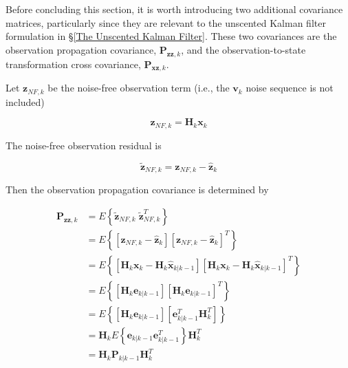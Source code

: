Before concluding this section, it is worth introducing two additional covariance matrices,
particularly since they are relevant to the unscented Kalman filter formulation in
\S\ref{The Unscented Kalman Filter}.
These two covariances are the observation propagation covariance, $\mathbf{P}_{\mathbf{zz},k}$,
and the observation-to-state transformation cross covariance, $\mathbf{P}_{\mathbf{xz},k}$.

Let $\mathbf{z}_{NF,k}$ be the noise-free observation term (i.e., the $\mathbf{v}_k$ noise
sequence is not included)

\begin{equation*}
    \mathbf{z}_{NF,k} = \mathbf{H}_k \mathbf{x}_k
\end{equation*}

The noise-free observation residual is

\begin{equation*}
    \tilde{\mathbf{z}}_{NF,k} = \mathbf{z}_{NF,k} - \hat{\mathbf{z}}_k
\end{equation*}

Then the observation propagation covariance is determined by

\begin{equation*}
    \begin{aligned}
        \mathbf{P}_{\mathbf{zz},k} &= E \left\{ \tilde{\mathbf{z}}_{NF,k} \; \tilde{\mathbf{z}}_{NF,k}^T \right\} \\
        &= E \left\{ \left[ \mathbf{z}_{NF,k} - \hat{\mathbf{z}}_k \right] \left[ \mathbf{z}_{NF,k} - \hat{\mathbf{z}}_k \right]^T \right\} \\
        &= E \left\{ \left[ \mathbf{H}_k \mathbf{x}_k - \mathbf{H}_k \hat{\mathbf{x}}_{k|k-1} \right] \left[ \mathbf{H}_k \mathbf{x}_k - \mathbf{H}_k \hat{\mathbf{x}}_{k|k-1} \right]^T \right\} \\
        &= E \left\{ \left[ \mathbf{H}_k \mathbf{e}_{k|k-1} \right] \left[ \mathbf{H}_k \mathbf{e}_{k|k-1} \right]^T \right\} \\
        &= E \left\{ \left[ \mathbf{H}_k \mathbf{e}_{k|k-1} \right] \left[ \mathbf{e}_{k|k-1}^T \mathbf{H}_k^T \right] \right\} \\
        &= \mathbf{H}_k E \left\{ \mathbf{e}_{k|k-1} \mathbf{e}_{k|k-1}^T \right\} \mathbf{H}_k^T \\
        &= \mathbf{H}_k \mathbf{P}_{k|k-1} \mathbf{H}_k^T
    \end{aligned}
\end{equation*}

